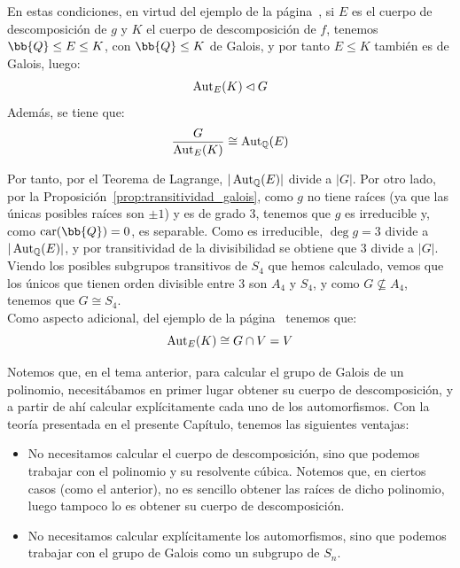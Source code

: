 \begin{ejemplo}
    \noindent
    En estas condiciones, en virtud del ejemplo de la página~\pageref{ejemplo:resolvente_cubica}, si $E$ es el cuerpo de descomposición de $g$ y $K$ el cuerpo de descomposición de $f$, tenemos $\bb{Q}\leq E\leq K$, con $\bb{Q}\leq K$ de Galois, y por tanto $E\leq K$ también es de Galois, luego:
    \begin{equation*}
        \operatorname{Aut}_E(K) \lhd G
    \end{equation*}
    Además, se tiene que:
    \begin{equation*}
        \dfrac{G}{\operatorname{Aut}_E(K)} \cong \operatorname{Aut}_\mathbb{Q}(E)
    \end{equation*}

    Por tanto, por el Teorema de Lagrange, $|\operatorname{Aut}_\mathbb{Q}(E)|$ divide a $|G|$. Por otro lado, por la Proposición~\ref{prop:transitividad_galois}, como $g$ no tiene raíces (ya que las únicas posibles raíces son $\pm 1$) y es de grado 3, tenemos que $g$ es irreducible y, como $\car(\bb{Q})=0$, es separable. Como es irreducible, $\deg g=3$ divide a $|\operatorname{Aut}_\mathbb{Q}(E)|$, y por transitividad de la divisibilidad se obtiene que $3$ divide a $|G|$. Viendo los posibles subgrupos transitivos de $S_4$ que hemos calculado, vemos que los únicos que tienen orden divisible entre 3 son $A_4$ y $S_4$, y como $G\not\subseteq A_4$, tenemos que $G\cong S_4$.\\
    
    Como aspecto adicional, del ejemplo de la página~\pageref{ejemplo:resolvente_cubica} tenemos que:
    \begin{equation*}
        \operatorname{Aut}_E(K) \cong G\cap V = V
    \end{equation*}
\end{ejemplo}

Notemos que, en el tema anterior, para calcular el grupo de Galois de un polinomio, necesitábamos en primer lugar obtener su cuerpo de descomposición, y a partir de ahí calcular explícitamente cada uno de los automorfismos. Con la teoría presentada en el presente Capítulo, tenemos las siguientes ventajas:
\begin{itemize}
    \item No necesitamos calcular el cuerpo de descomposición, sino que podemos trabajar con el polinomio y su resolvente cúbica. Notemos que, en ciertos casos (como el anterior), no es sencillo obtener las raíces de dicho polinomio, luego tampoco lo es obtener su cuerpo de descomposición.
    \item No necesitamos calcular explícitamente los automorfismos, sino que podemos trabajar con el grupo de Galois como un subgrupo de $S_n$.
\end{itemize}



